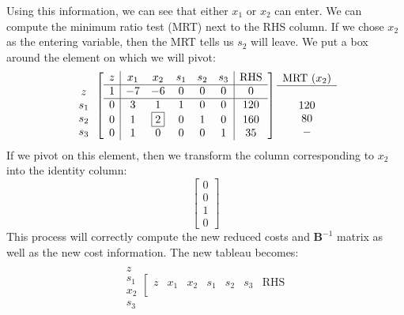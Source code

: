 \begin{example}
Using this information, we can see that either $x_1$ or $x_2$ can enter. We can compute the minimum ratio test (MRT) next to the RHS column. If we chose $x_2$ as the entering variable, then the MRT tells us $s_2$ will leave. We put a box around the element on which we will pivot:
\begin{equation}
\begin{array}{c}
\\
z\\
s_1\\
s_2\\
s_3
\end{array}
\left[
\begin{array}{c|ccccc|c}
z& x_1 & x_2 & s_1 & s_2 & s_3 & \text{RHS}\\
\hline
1 & -7 & -6 & 0 & 0 & 0 & 0\\
\hline
0 &  3 &  1 & 1 & 0 & 0 & 120\\
0 &  1 &  \fbox{2} & 0 & 1 & 0 & 160\\
0 &  1 &  0 & 0 & 0 & 1 & 35\\
\end{array}\right]
\begin{array}{c}
\text{MRT ($x_2$)}\\
\hline
\\
120\\
80\\
-
\end{array}
\end{equation}
If we pivot on this element, then we transform the column corresponding to $x_2$ into the identity column:
\begin{equation}
\begin{bmatrix}0 \\ 0 \\ 1 \\ 0
\end{bmatrix}
\end{equation}
This process will correctly compute the new reduced costs and $\mathbf{B}^{-1}$ matrix as well as the new cost information. The new tableau becomes:
\begin{equation}
\begin{array}{c}
\\
z\\
s_1\\
x_2\\
s_3
\end{array}
\left[
\begin{array}{c|ccccc|c}
z& x_1 & x_2 & s_1 & s_2 & s_3 & \text{RHS}\\

\end{array}
\end{equation}
\end{example}
